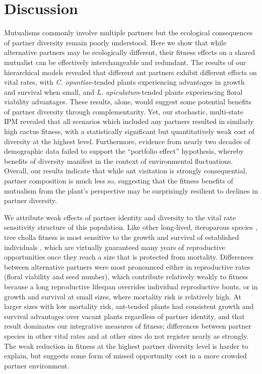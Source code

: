 \documentclass[11pt]{article}
\begin{document}
\section*{Discussion}
Mutualisms commonly involve multiple partners but the ecological consequences of partner diversity remain poorly understood. 
Here we show that while alternative partners may be ecologically different, their fitness effects on a shared mutualist can be effectively interchangeable and redundant.
The results of our hierarchical models revealed that different ant partners exhibit different effects on vital rates, with \textit{C. opuntiae}-tended plants experiencing advantages in growth and survival when small, and \textit{L. apiculatum}-tended plants experiencing floral viability advantages. 
These results, alone, would suggest some potential benefits of partner diversity through complementarity.  
Yet, our stochastic, multi-state IPM revealed that all scenarios which included any partners resulted in similarly high cactus fitness, with a statistically significant but quantitatively weak cost of diversity at the highest level. 
Furthermore, evidence from nearly two decades of demographic data failed to support the ``portfolio effect'' hypothesis, whereby benefits of diversity manifest in the context of environmental fluctuations. 
Overall, our results indicate that while ant visitation is strongly consequential, partner composition is much less so, suggesting that the fitness benefits of mutualism from the plant's perspective may be surprisingly resilient to declines in partner diversity. 

We attribute weak effects of partner identity and diversity to the vital rate sensitivity structure of this population. 
Like other long-lived, iteroparous species \citep{Franco2004}, tree cholla fitness is most sensitive to the growth and survival of established individuals \citep{Miller2009,elderd2016quantifying}, which are virtually guaranteed many years of reproductive opportunities once they reach a size that is protected from mortality. 
Differences between alternative partners were most pronounced either in reproductive rates (floral viability and seed number), which contribute relatively weakly to fitness because a long reproductive lifespan overrides individual reproductive bouts, or in growth and survival at small sizes, where mortality risk is relatively high. 
At larger sizes with low mortality risk, ant-tended plants had consistent growth and survival advantages over vacant plants regardless of partner identity, and that result dominates our integrative measures of fitness; differences between partner species in other vital rates and at other sizes do not register nearly as strongly. 
The weak reduction in fitness at the highest partner diversity level is harder to explain, but suggests some form of missed opportunity cost in a more crowded partner environment. 
\end{document}
